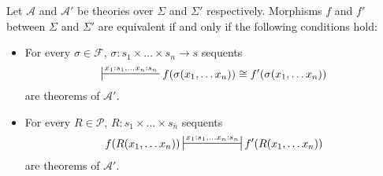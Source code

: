 \documentclass{amsart}
\theoremstyle{definition}
\theoremstyle{remark}
\numberwithin{figure}{section}
\begin{document}
\begin{prop}[mor-eq]
Let $\mathcal{A}$ and $\mathcal{A}'$ be theories over $\Sigma$ and $\Sigma'$ respectively.
Morphisms $f$ and $f'$ between $\Sigma$ and $\Sigma'$ are equivalent if and only if the following conditions hold:
\begin{itemize}
\item For every $\sigma \in \mathcal{F}$, $\sigma : s_1 \times \ldots \times s_n \to s$ sequents
\[ \sststile{}{x_1 : s_1, \ldots x_n : s_n} f(\sigma(x_1, \ldots x_n)) \cong f'(\sigma(x_1, \ldots x_n)) \]
are theorems of $\mathcal{A}'$.
\item For every $R \in \mathcal{P}$, $R : s_1 \times \ldots \times s_n$ sequents
\[ f(R(x_1, \ldots x_n)) \ssststile{}{x_1 : s_1, \ldots x_n : s_n} f'(R(x_1, \ldots x_n)) \]
are theorems of $\mathcal{A}'$.
\end{itemize}
\end{prop}
\end{document}
